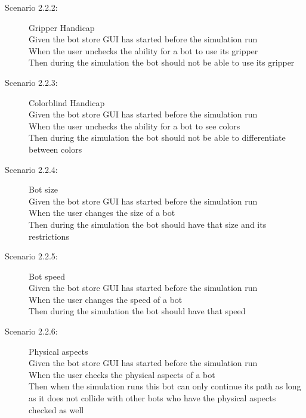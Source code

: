 \documentclass{article}
\begin{document}
\begin{description}
\begin{description}
    \item[Scenario 2.2.2:] Gripper Handicap\\
    Given the bot store GUI has started before the simulation run\\
    When the user unchecks the ability for a bot to use its gripper\\
    Then during the simulation the bot should not be able to use its gripper

    \item[Scenario 2.2.3:] Colorblind Handicap\\
    Given the bot store GUI has started before the simulation run\\
    When the user unchecks the ability for a bot to see colors\\
    Then during the simulation the bot should not be able to differentiate between colors

    \item[Scenario 2.2.4:] Bot size\\
    Given the bot store GUI has started before the simulation run\\
    When the user changes the size of a bot\\
    Then during the simulation the bot should have that size and its restrictions

    \item[Scenario 2.2.5:] Bot speed\\
    Given the bot store GUI has started before the simulation run\\
    When the user changes the speed of a bot\\
    Then during the simulation the bot should have that speed

    \item[Scenario 2.2.6:] Physical aspects\\
    Given the bot store GUI has started before the simulation run\\
    When the user checks the physical aspects of a bot\\
    Then when the simulation runs this bot can only continue its path as long as it does not collide with other bots who have the physical aspects checked as well
  \end{description}
\end{description}
\end{document}
